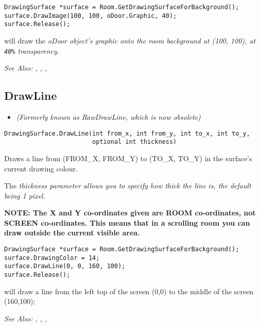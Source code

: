 \begin{verbatim}
DrawingSurface *surface = Room.GetDrawingSurfaceForBackground();
surface.DrawImage(100, 100, oDoor.Graphic, 40);
surface.Release();
\end{verbatim}
will draw the \it{oDoor} object's graphic onto the room background at (100, 100), at \verb$40%$
transparency.

\it{See Also:}
,
,
,


\subsection{DrawLine}\label{DrawingSurface.DrawLine}%

\begin{itemize}
\item \it{(Formerly known as RawDrawLine, which is now obsolete)}
\end{itemize}

\begin{verbatim}
DrawingSurface.DrawLine(int from_x, int from_y, int to_x, int to_y,
                        optional int thickness)
\end{verbatim}
Draws a line from (FROM_X, FROM_Y) to (TO_X, TO_Y) in the surface's current drawing colour.

The \it{thickness} parameter allows you to specify how thick the line is, the default being 1 pixel.

\bf{NOTE:} The X and Y co-ordinates given are ROOM co-ordinates, not SCREEN co-ordinates.
This means that in a scrolling room you can draw outside the current visible area.

\begin{verbatim}
DrawingSurface *surface = Room.GetDrawingSurfaceForBackground();
surface.DrawingColor = 14;
surface.DrawLine(0, 0, 160, 100);
surface.Release();
\end{verbatim}
will draw a line from the left top of the screen (0,0) to the middle of the screen (160,100);

\it{See Also:} ,
,
,


